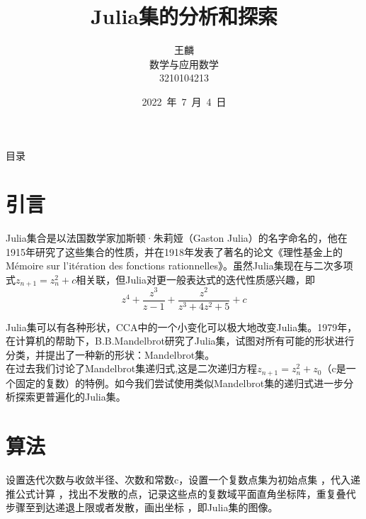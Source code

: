 \documentclass{ctexbeamer}
\begin{document}

\title{Julia集的分析和探索}
\author{王麟 \\ 数学与应用数学\\3210104213}
\date{2022~年~7~月~4~日}
\frame{\titlepage}



\begin{frame}{目录} 
\begin{center}        
  \tableofcontents[hideallsubsections]
  \end{center}
\end{frame}



\section{引言}    
\indent Julia集合是以法国数学家加斯顿·朱莉娅（Gaston Julia）的名字命名的，他在1915年研究了这些集合的性质，并在1918年发表了著名的论文《理性基金上的Mémoire sur l'itération des fonctions rationnelles》。虽然Julia集现在与二次多项式$z_{n+1}=z^2_n+c$相关联，但Julia对更一般表达式的迭代性质感兴趣，即
$$z^4+\frac{z^3}{z-1}+\frac{z^2}{z^3+4z^2+5}+c$$

Julia集可以有各种形状，CCA中的一个小变化可以极大地改变Julia集。1979年，在计算机的帮助下，B.B.Mandelbrot研究了Julia集，试图对所有可能的形状进行分类，并提出了一种新的形状：Mandelbrot集。\\
\indent 在过去我们讨论了Mandelbrot集递归式,这是二次递归方程$z_{n+1}=z^2_n+z_0$（c是一个固定的复数）的特例。如今我们尝试使用类似Mandelbrot集的递归式进一步分析探索更普遍化的Julia集。


\section{算法}  
\begin{frame}
\begin{center}
设置迭代次数与收敛半径、次数和常数c，设置一个复数点集为初始点集 ，代入递推公式计算 ，找出不发散的点，记录这些点的复数域平面直角坐标阵，重复叠代步骤至到达递退上限或者发散，画出坐标 ，即Julia集的图像。
\end{center}
\end{frame}
\end{document}
